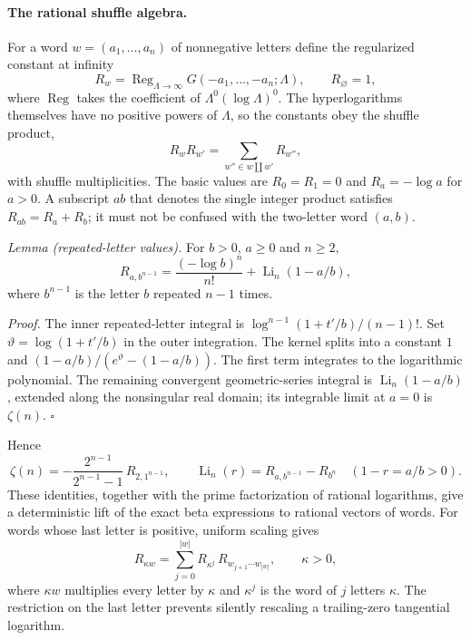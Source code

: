 \documentclass[11pt,a4paper]{article}
\numberwithin{equation}{section}
\newcommand{\Li}{\operatorname{Li}}
\begin{document}
\paragraph{The rational shuffle algebra.} For a word $w=(a_1,\ldots,a_n)$ of nonnegative letters define the
regularized constant at infinity
\begin{equation}
 R_w=\operatorname{Reg}_{\Lambda\to\infty}G(-a_1,\ldots,-a_n;\Lambda),\qquad R_\varnothing=1,
 \label{eq:dualC:Rw}
\end{equation}
where $\operatorname{Reg}$ takes the coefficient of $\Lambda^0(\log\Lambda)^0$. The hyperlogarithms themselves have no
positive powers of $\Lambda$, so the constants obey the shuffle product,
\begin{equation}
 R_wR_{w'}=\sum_{w''\in w\mathbin{\amalg}w'}R_{w''},
\end{equation}
with shuffle multiplicities. The basic values are $R_0=R_1=0$ and $R_a=-\log a$ for $a>0$. A subscript $ab$ that
denotes the single integer product satisfies $R_{ab}=R_a+R_b$; it must not be confused with the two-letter word $(a,b)$.

\emph{Lemma (repeated-letter values).} For $b>0$, $a\ge0$ and $n\ge2$,
\begin{equation}
 R_{a,b^{n-1}}=\frac{(-\log b)^n}{n!}+\Li_n(1-a/b),
 \label{eq:dualC:repeated}
\end{equation}
where $b^{n-1}$ is the letter $b$ repeated $n-1$ times.

\emph{Proof.} The inner repeated-letter integral is $\log^{n-1}(1+t'/b)/(n-1)!$. Set $\vartheta=\log(1+t'/b)$ in the outer
integration. The kernel splits into a constant $1$ and $(1-a/b)/(e^\vartheta-(1-a/b))$. The first term integrates to the
logarithmic polynomial. The remaining convergent geometric-series integral is $\Li_n(1-a/b)$, extended along the
nonsingular real domain; its integrable limit at $a=0$ is $\zeta(n)$. $\square$

Hence
\begin{equation}
 \zeta(n)=-\frac{2^{n-1}}{2^{n-1}-1}\,R_{2,1^{n-1}},\qquad
 \Li_n(r)=R_{a,b^{n-1}}-R_{b^n}\quad(1-r=a/b>0).
\end{equation}
These identities, together with the prime factorization of rational logarithms, give a deterministic lift of the exact
beta expressions to rational vectors of words. For words whose last letter is positive, uniform scaling gives
\begin{equation}
 R_{\kappa w}=\sum_{j=0}^{|w|}R_{\kappa^j}\,R_{w_{j+1}\cdots w_{|w|}},\qquad \kappa>0,
\end{equation}
where $\kappa w$ multiplies every letter by $\kappa$ and $\kappa^j$ is the word of $j$ letters $\kappa$. The restriction
on the last letter prevents silently rescaling a trailing-zero tangential logarithm.
\end{document}
